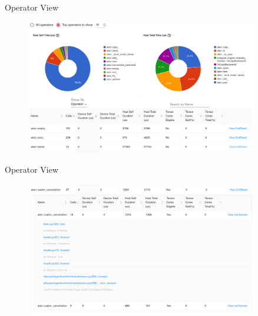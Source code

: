 \documentclass[compress,aspectratio=169]{beamer}
\begin{document}
\begin{frame}{Operator View}
    \vspace{-1em}
\begin{center}
    \begin{figure}
        \includegraphics[width=0.9\textwidth]{../../data/scap_gtx1080_profiler-torch_batch-size-64_14650758_operator-view}
    \end{figure}
    \end{center}
\end{frame}

\begin{frame}{Operator View}
    \vspace{-1em}
\begin{center}
    \begin{figure}
        \includegraphics[width=0.9\textwidth]{../../data/scap_gtx1080_profiler-torch_batch-size-64_14650758_operator-view-details}
    \end{figure}
    \end{center}
\end{frame}
\end{document}
